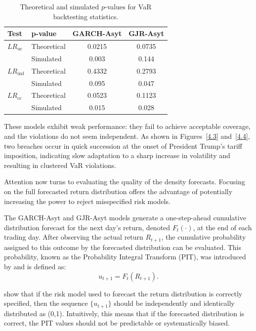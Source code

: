 \begin{table}[H]
\centering
\begin{tabular}{llcc}
\toprule
\textbf{Test} & \textbf{p-value} & \textbf{GARCH-Asyt} & \textbf{GJR-Asyt} \\
\midrule
$LR_{\text{uc}}$   & Theoretical & 0.0215 & 0.0735 \\
                   & Simulated   & 0.003 & 0.144 \\
$LR_{\text{ind}}$  & Theoretical & 0.4332 & 0.2793 \\
                   & Simulated   & 0.095 &  0.047 \\
$LR_{\text{cc}}$   & Theoretical & 0.0523 & 0.1123 \\
                   & Simulated   & 0.015 & 0.028 \\
\bottomrule
\end{tabular}
\caption{Theoretical and simulated $p$-values for VaR backtesting statistics.}
\label{tab:4.2}
\end{table}

\newpage
These models exhibit weak performance: they fail to achieve acceptable coverage, and the violations do not seem independent. As shown in Figures~\ref{4.3} and~\ref{4.4}, two breaches occur in quick succession at the onset of President Trump’s tariff imposition, indicating slow adaptation to a sharp increase in volatility and resulting in clustered VaR violations.

Attention now turns to evaluating the quality of the density forecasts. Focusing on the full forecasted return distribution offers the advantage of potentially increasing the power to reject misspecified risk models.

The GARCH-Asyt and GJR-Asyt models generate a one-step-ahead cumulative distribution forecast for the next day’s return, denoted $F_t(\cdot)$, at the end of each trading day. After observing the actual return $R_{t+1}$, the cumulative probability assigned to this outcome by the forecasted distribution can be evaluated. This probability, known as the Probability Integral Transform (PIT), was introduced by  and is defined as:
\begin{equation}
u_{t+1} = F_t(R_{t+1}).
\label{eq:4.6}
\end{equation}

 show that if the risk model used to forecast the return distribution is correctly specified, then the sequence $\{u_{t+1}\}$ should be independently and identically distributed as (0,1). Intuitively, this means that if the forecasted distribution is correct, the PIT values should not be predictable or systematically biased.


